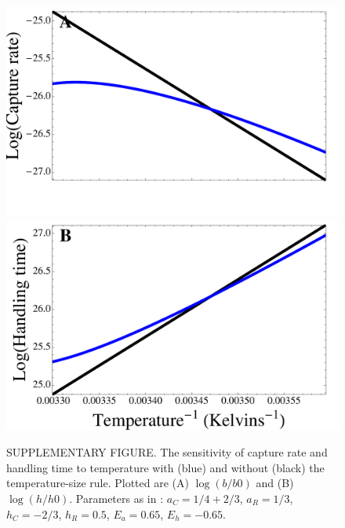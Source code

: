 \documentclass[11pt]{article}
\begin{document}
\begin{figure}[!ht]
\centering
\includegraphics[width=0.5\linewidth]{CaptureTSRAsymm}\\\vspace{-0.75cm}
\includegraphics[width=0.5\linewidth]{HandlingTSRAsymm}
\caption{
SUPPLEMENTARY FIGURE.
The sensitivity of capture rate and handling time to temperature with (blue) and without (black) the temperature-size rule.
Plotted are (A) $\log(b/b0)$ and (B) $\log(h/h0)$.
Parameters as in \cite{Rall2012}: $a_C = 1/4+2/3$, $a_R = 1/3$, $h_C = -2/3$, $h_R = 0.5$, $E_a = 0.65$, $E_h = -0.65$.
}
\label{CaptureTimeT}
\end{figure}
\end{document}
